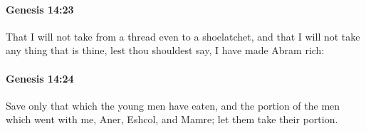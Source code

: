 		\paragraph{Genesis 14:23} %
			\label{GENESIS-14-23}

			That I will not take from a thread even to a shoelatchet, and that I will not take any thing that is thine, lest thou shouldest say, I have made Abram rich:


		\paragraph{Genesis 14:24} %
			\label{GENESIS-14-24}

			Save only that which the young men have eaten, and the portion of the men which went with me, Aner, Eshcol, and Mamre; let them take their portion.

